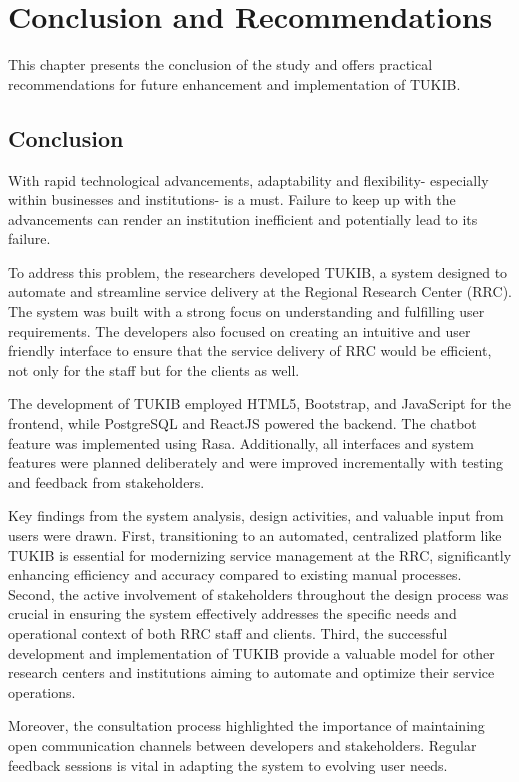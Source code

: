 \chapter{Conclusion and Recommendations}
This chapter presents the conclusion of the study and offers practical recommendations for future enhancement and implementation of TUKIB.

\section{Conclusion}

With rapid technological advancements, adaptability and flexibility- especially within businesses and institutions- is a must. Failure to keep up with the advancements can render an institution inefficient and potentially lead to its failure.

To address this problem, the researchers developed TUKIB, a system designed to automate and streamline service delivery at the Regional Research Center (RRC). The system was built with a strong focus on understanding and fulfilling user requirements. The developers also focused on creating an intuitive and user friendly interface to ensure that the service delivery of RRC would be efficient, not only for the staff but for the clients as well. 

The development of TUKIB employed HTML5, Bootstrap, and JavaScript for the frontend, while PostgreSQL and ReactJS powered the backend. The chatbot feature was implemented using Rasa. Additionally, all interfaces and system features were planned deliberately and were improved incrementally with testing and feedback from stakeholders. 

Key findings from the system analysis, design activities, and valuable input from users were drawn. First, transitioning to an automated, centralized platform like TUKIB is essential for modernizing service management at the RRC, significantly enhancing efficiency and accuracy compared to existing manual processes. Second, the active involvement of stakeholders throughout the design process was crucial in ensuring the system effectively addresses the specific needs and operational context of both RRC staff and clients. Third, the successful development and implementation of TUKIB provide a valuable model for other research centers and institutions aiming to automate and optimize their service operations.

Moreover, the consultation process highlighted the importance of maintaining open communication channels between developers and stakeholders. Regular feedback sessions is vital in adapting the system to evolving user needs.


